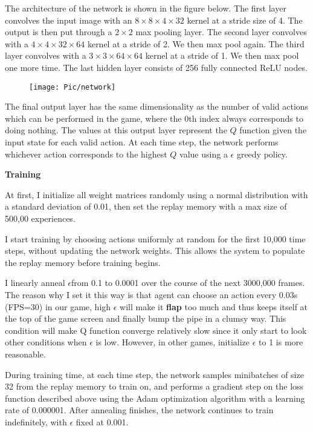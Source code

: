 \documentclass[a4paper, 11pt]{article}
\begin{document}
The architecture of the network is shown in the figure below. The first
layer convolves the input image with an $8\times 8\times 4\times 32$ kernel at a stride size
of 4. The output is then put through a $2\times 2$ max pooling layer. The second
layer convolves with a $4\times 4\times 32\times 64$ kernel at a stride of 2. We then max
pool again. The third layer convolves with a $3\times 3\times 64\times 64$ kernel at a
stride of 1. We then max pool one more time. The last hidden layer consists of 256 fully connected ReLU nodes.
\begin{figure}[ht]
\centering
\texttt{[image: Pic/network]}
\end{figure}

The final output layer has the same dimensionality as the number of valid actions which can be performed in the game, where the 0th index always corresponds to doing nothing. The values at this output layer
represent the $Q$ function given the input state for each valid action. At each time step, the network performs whichever action corresponds to the highest $Q$ value using a $\epsilon$ greedy policy.

\textbf{Training}

At first, I initialize all weight matrices randomly using a normal distribution with a standard deviation of 0.01, then set the replay memory with a max size of 500,00 experiences.

I start training by choosing actions uniformly at random for the first 10,000 time steps, without updating the network weights. This allows the
system to populate the replay memory before training begins.

I linearly anneal $\epsilon$from 0.1 to 0.0001 over the course of the next 3000,000 frames. The reason why I set it this way is that agent can choose an action every 0.03s (FPS=30) in our game, high $\epsilon$ will make it \textbf{flap} too much and thus keeps itself at the top of the game screen and finally bump the pipe in a clumsy way. This condition will make Q function converge relatively slow since it only start to look other conditions when $\epsilon$ is low. However, in other games, initialize $\epsilon$ to 1 is more reasonable.

During training time, at each time step, the network samples minibatches of size 32 from the replay memory to train on, and performs a gradient step on the loss function described above using the Adam optimization
algorithm with a learning rate of 0.000001. After annealing finishes, the network continues to train indefinitely, with $\epsilon$ fixed at 0.001.
\end{document}

